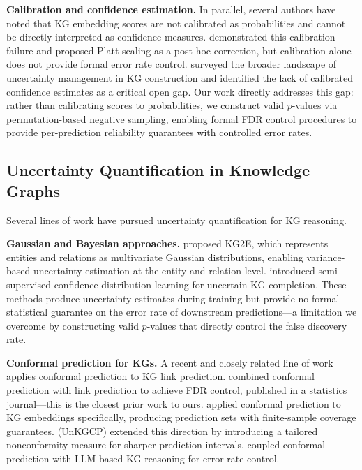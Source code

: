 \textbf{Calibration and confidence estimation.}
In parallel, several authors have noted that KG embedding scores are not calibrated as probabilities and cannot be directly interpreted as confidence measures.
\cite{tabacof2020probability} demonstrated this calibration failure and proposed Platt scaling as a post-hoc correction, but calibration alone does not provide formal error rate control.
\cite{jarnac2025uncertainty} surveyed the broader landscape of uncertainty management in KG construction and identified the lack of calibrated confidence estimates as a critical open gap.
Our work directly addresses this gap: rather than calibrating scores to probabilities, we construct valid $p$-values via permutation-based negative sampling, enabling formal FDR control procedures to provide per-prediction reliability guarantees with controlled error rates.

\subsection{Uncertainty Quantification in Knowledge Graphs}

Several lines of work have pursued uncertainty quantification for KG reasoning.

\textbf{Gaussian and Bayesian approaches.}
\cite{he2015learning} proposed KG2E, which represents entities and relations as multivariate Gaussian distributions, enabling variance-based uncertainty estimation at the entity and relation level.
\cite{wu2025uncertain} introduced semi-supervised confidence distribution learning for uncertain KG completion.
These methods produce uncertainty estimates during training but provide no formal statistical guarantee on the error rate of downstream predictions---a limitation we overcome by constructing valid $p$-values that directly control the false discovery rate.

\textbf{Conformal prediction for KGs.}
A recent and closely related line of work applies conformal prediction to KG link prediction.
\cite{marandon2024conformal} combined conformal prediction with link prediction to achieve FDR control, published in a statistics journal---this is the closest prior work to ours.
\cite{zhu2025conformal} applied conformal prediction to KG embeddings specifically, producing prediction sets with finite-sample coverage guarantees.
\cite{zhu2025certainty} (UnKGCP) extended this direction by introducing a tailored nonconformity measure for sharper prediction intervals.
\cite{ni2025towards} coupled conformal prediction with LLM-based KG reasoning for error rate control.

